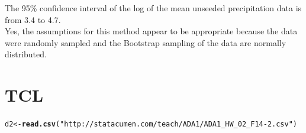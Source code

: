 \documentclass{article}\usepackage[]{graphicx}\usepackage[]{color}
\makeatletter
\newcommand{\hlstr}[1]{\textcolor[rgb]{0.192,0.494,0.8}{#1}}%
\newcommand{\hlstd}[1]{\textcolor[rgb]{0.345,0.345,0.345}{#1}}%
\newcommand{\hlkwb}[1]{\textcolor[rgb]{0.69,0.353,0.396}{#1}}%
\newcommand{\hlkwd}[1]{\textcolor[rgb]{0.737,0.353,0.396}{\textbf{#1}}}%
\newenvironment{kframe}{%
 \def\at@end@of@kframe{}%
 \ifinner\ifhmode%
  \def\at@end@of@kframe{\end{minipage}}%
  \begin{minipage}{\columnwidth}%
 \fi\fi%
 \def\FrameCommand##1{\hskip\@totalleftmargin \hskip-\fboxsep
 \colorbox{shadecolor}{##1}\hskip-\fboxsep
     \hskip-\linewidth \hskip-\@totalleftmargin \hskip\columnwidth}%
 \MakeFramed {\advance\hsize-\width
   \@totalleftmargin\z@ \linewidth\hsize
   \@setminipage}}%
 {\par\unskip\endMakeFramed%
 \at@end@of@kframe}
\newenvironment{knitrout}{}{} %
\makeatother
\begin{document}
The 95\% confidence interval of the log of the mean unseeded precipitation data
is from 3.4 to 4.7.\\
Yes, the assumptions for this method appear to be appropriate because the data
were randomly sampled and the Bootstrap sampling of the data are normally distributed.

\section{TCL}
\begin{knitrout}
\color{fgcolor}\begin{kframe}
\begin{alltt}
\hlstd{d2} \hlkwb{<-} \hlkwd{read.csv}\hlstd{(}\hlstr{"http://statacumen.com/teach/ADA1/ADA1_HW_02_F14-2.csv"}\hlstd{)}
\end{alltt}
\end{kframe}
\end{knitrout}
\end{document}
